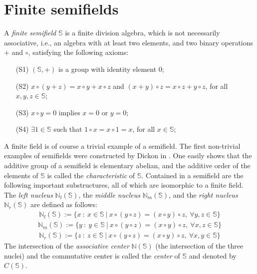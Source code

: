 \documentclass[12pt]{amsart}
\begin{document}
\section{Finite semifields}
A {\it finite semifield} $\mathbb S$ is a finite division algebra, which is not necessarily associative, i.e.,  an algebra with at least two elements, and two binary operations $+$ and $\circ$, satisfying the following axioms:
\begin{itemize}
\item[(S1)] $({\mathbb{S}},+)$ is a group with identity element $0$;
\item[(S2)] $x\circ(y+z) =x\circ y + x\circ z$ and $(x+y)\circ z = x\circ z + y 
\circ z$, for all $x,y,z \in {\mathbb{S}}$;
\item[(S3)] $x\circ y =0$ implies $x=0$ or $y=0$; 
\item[(S4)] $\exists 1 \in {\mathbb{S}}$ such that $1\circ x = x \circ 1 = x$, for all $x \in {\mathbb{S}}$;
\end{itemize} 
A finite field is of course a trivial example of a semifield. The first non-trivial examples of semifields were constructed by Dickon in \cite{Dickson1906}. One easily shows that the additive group of a semifield is elementary abelian, and the additive order of the elements of $\mathbb S$ is called the {\it characteristic} of $\mathbb S$. Contained in a semifield are the following important substructures, all of which are isomorphic to a finite field. The {\it left nucleus} ${\mathbb{N}}_l({\mathbb{S}})$, the {\it middle nucleus} ${\mathbb{N}}_m({\mathbb{S}})$, and the {\it right nucleus} ${\mathbb{N}}_r({\mathbb{S}})$ are defined as follows:
\begin{eqnarray}
{\mathbb{N}}_l({\mathbb{S}}):=\{x~:~ x \in {\mathbb{S}} ~|~ x \circ (y\circ z)=(x\circ y)\circ z, ~\forall y,z \in {\mathbb{S}}\}
\end{eqnarray}
\begin{eqnarray}
{\mathbb{N}}_m({\mathbb{S}}):=\{y~:~ y \in {\mathbb{S}} ~|~ x \circ (y\circ z)=(x\circ y)\circ z, ~\forall x,z \in {\mathbb{S}}\}
\end{eqnarray}
\begin{eqnarray}
{\mathbb{N}}_r({\mathbb{S}}):=\{z~:~ z \in {\mathbb{S}} ~|~ x \circ (y\circ z)=(x\circ y)\circ z, ~\forall x,y \in {\mathbb{S}}\}
\end{eqnarray}
The intersection of the {\it associative center} ${\mathbb{N}}({\mathbb{S}})$ (the intersection of the three nuclei) and the commutative center is called the {\it center} of $\mathbb S$ and denoted by $C({\mathbb{S}})$. 
\end{document}
